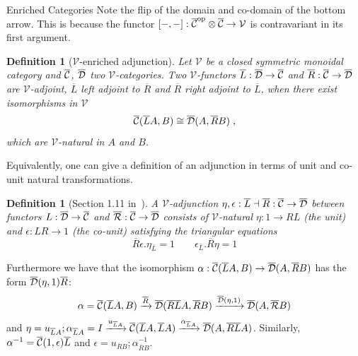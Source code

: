 \documentclass[acmsmall, screen, nonacm]{acmart}
\newtheorem{definition}[theorem]{Definition}
\begin{document}
\begin{section}{Enriched Categories}
Note the flip of the domain and co-domain of the bottom arrow.
This is because the functor $[-,-] : {\overline{\mathcal{C}}}^{\text{op}} \otimes {\overline{\mathcal{C}}} \to \mathcal{V}$ is contravariant in its first argument.

\begin{definition}[$\mathcal{V}$-enriched adjunction]
  Let $\mathcal{V}$ be a closed symmetric monoidal category and ${\overline{\mathcal{C}}}$, ${\overline{\mathcal{D}}}$ two $\mathcal{V}$-categories.
  Two $\mathcal{V}$-functors $\overline{L} : {\overline{\mathcal{D}}} \to {\overline{\mathcal{C}}}$ and $\overline{R} : {\overline{\mathcal{C}}} \to {\overline{\mathcal{D}}}$ are $\mathcal{V}$-adjoint, $\overline{L}$ left adjoint to $\overline{R}$ and $\overline{R}$ right adjoint to $\overline{L}$, when there exist isomorphisms in $\mathcal{V}$
  \[
  {\overline{\mathcal{C}}}(\overline{L}A,B) \cong {\overline{\mathcal{D}}}(A, \overline{R}B) \;,
  \]
  which are $\mathcal{V}$-natural in $A$ and $B$.
\end{definition}

Equivalently, one can give a definition of an adjunction in terms of unit and co-unit natural transformations.

\begin{definition}[Section 1.11 in~\cite{Kelly2022BASICCO}]
  A $\mathcal{V}$-adjunction $\eta, \epsilon: \overline{L} \;\reflectbox{$\vdash$}\; \overline{R} : \enriched{C} \to \enriched{D}$ between functors $L : {\overline{\mathcal{D}}} \to {\overline{\mathcal{C}}}$ and ${\overline{\mathcal{R}}} : {\overline{\mathcal{C}}} \to {\overline{\mathcal{D}}}$ consists of $\mathcal{V}$-natural $\eta : 1 \to RL$ (the \textit{unit}) and $\epsilon : LR \to 1$ (the \textit{co-unit}) satisfying the triangular equations
  \[
  \overline{R}\epsilon . \eta_{\overline{L}} = 1 \qquad \epsilon_{\overline{L}} . \overline{R} \eta = 1
  \]
\end{definition}
Furthermore we have that the isomorphism $\alpha : {\overline{\mathcal{C}}}(\overline{L}A,B) \to {\overline{\mathcal{D}}}(A, \overline{R}B)$ has the form ${\overline{\mathcal{D}}}(\eta, 1)\overline{R}$:
\[
  \alpha = {\overline{\mathcal{C}}}(\overline{L}A, B) \xrightarrow{\overline{R}} {\overline{\mathcal{D}}}(\overline{RL}A, \overline{R}B) \xrightarrow{{\overline{\mathcal{D}}}(\eta, 1)} {\overline{\mathcal{D}}}(A, {\overline{\mathcal{R}}}B)
\]
and $\eta = u_{\overline{L}A};\alpha_{\overline{L}A} = I \xrightarrow{u_{\overline{L}A}}{\overline{\mathcal{C}}}(\overline{L}A, \overline{L}A) \xrightarrow{\alpha_{\overline{L}A}} {\overline{\mathcal{D}}}(A,\overline{RL}A)$.
Similarly, $\alpha^{-1} = {\overline{\mathcal{C}}}(1,\epsilon)\overline{L}$ and $\epsilon = u_{\overline{R}B};\alpha^{-1}_{\overline{R}B}$.


\end{section}
\end{document}
